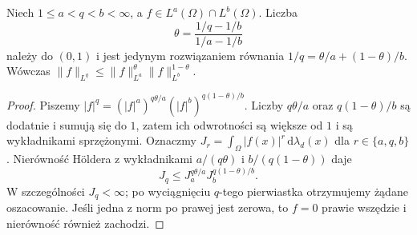 \begin{lemat}
\label{lem:pde10-interpolation}
Niech $1\le a<q<b<\infty$, a $f\in L^a(\Omega)\cap L^b(\Omega)$.
Liczba
\[
 \theta=\frac{1/q-1/b}{1/a-1/b}
\]
należy do $(0,1)$ i jest jedynym rozwiązaniem
równania $1/q=\theta/a+(1-\theta)/b$. Wówczas
$\|f\|_{L^q}\le\|f\|_{L^a}^\theta
\|f\|_{L^b}^{1-\theta}$.
\end{lemat}
\begin{proof}
Piszemy $|f|^q=(|f|^a)^{q\theta/a}
(|f|^b)^{q(1-\theta)/b}$.
Liczby $q\theta/a$ oraz $q(1-\theta)/b$ są dodatnie
i sumują się do $1$, zatem ich odwrotności są większe
od $1$ i są wykładnikami sprzężonymi.
Oznaczmy $J_r=\int_\Omega|f(x)|^r\,\mathrm d\lambda_d(x)$
dla $r\in\{a,q,b\}$. Nierówność H\"oldera z wykładnikami
$a/(q\theta)$ i $b/(q(1-\theta))$ daje
\[
 J_q\le J_a^{q\theta/a}J_b^{q(1-\theta)/b}.
\]
W szczególności $J_q<\infty$; po wyciągnięciu
$q$-tego pierwiastka otrzymujemy żądane oszacowanie.
Jeśli jedna z norm po prawej jest zerowa, to
$f=0$ prawie wszędzie i nierówność również zachodzi.
\end{proof}


